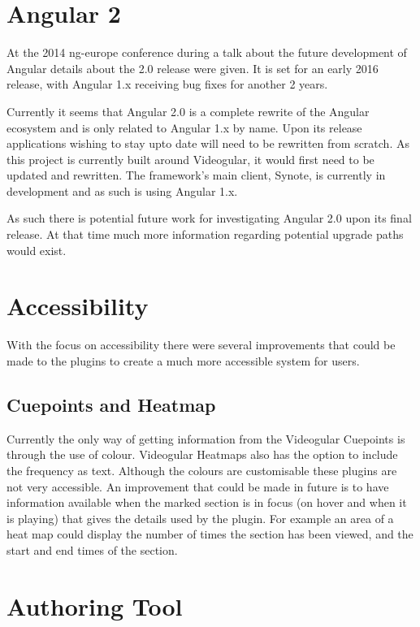 \section{Angular 2}

At the 2014 ng-europe conference during a talk about the future development of Angular details about the 2.0 release were given. It is set for an early 2016 release, with Angular 1.x receiving bug fixes for another 2 years. 

Currently it seems that Angular 2.0 is a complete rewrite of the Angular ecosystem and is only related to Angular 1.x by name. Upon its release applications wishing to stay upto date will need to be rewritten from scratch. As this project is currently built around Videogular, it would first need to be updated and rewritten. The framework's main client, Synote, is currently in development and as such is using Angular 1.x. 

As such there is potential future work for investigating Angular 2.0 upon its final release. At that time much more information regarding potential upgrade paths would exist.

\section{Accessibility}

With the focus on accessibility there were several improvements that could be made to the plugins to create a much more accessible system for users.

\subsection{Cuepoints and Heatmap}

Currently the only way of getting information from the \gls{Videogular} Cuepoints is through the use of colour. \gls{Videogular} Heatmaps also has the option to include the frequency as text. Although the colours are customisable these plugins are not very accessible. An improvement that could be made in future is to have information available when the marked section is in focus (on hover and when it is playing) that gives the details used by the plugin. For example an area of a heat map could display the number of times the section has been viewed, and the start and end times of the section.

\section{Authoring Tool}

